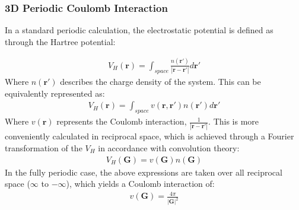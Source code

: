 \documentclass[letterpaper,10pt,english]{sphinxmanual}
\begin{document}
\subsubsection{3D Periodic Coulomb Interaction}
\label{\detokenize{cutoff_coulomb:d-periodic-coulomb-interaction}}
In a standard periodic calculation, the electrostatic potential is
defined as through the Hartree potential:

\label{\detokenize{cutoff_coulomb:equation-hartree}}\begin{equation}\label{equation:cutoff_coulomb:hartree}
\begin{split}V_{H}(\mathbf{r}) = \int_{space} {\frac{n(\mathbf{r'})}{|\mathbf{r} -  \mathbf{r'}|}}  d\mathbf{r'}\end{split}
\end{equation}
Where \(n(\mathbf{r'})\) describes the charge density of the system.
This can be equivalently represented as:
\begin{equation*}
\begin{split}V_{H}(\mathbf{r}) = \int_{space} v(\mathbf{r},\mathbf{r'})n(\mathbf{r'}) d\mathbf{r'}\end{split}
\end{equation*}
Where \(v(\mathbf{r})\) represents the Coulomb interaction,
\(\frac{1}{|\mathbf{r} -  \mathbf{r'}|}\). This is more conveniently
calculated in reciprocal space, which is achieved through a Fourier
transformation of the \(V_{H}\) in accordance with convolution
theory:
\begin{equation*}
\begin{split}V_{H}(\mathbf{G}) = v(\mathbf{G})n(\mathbf{G})\end{split}
\end{equation*}
In the fully periodic case, the above expressions are taken over all
reciprocal space (\(\infty\) to \(-\infty\)), which yields a
Coulomb interaction of:
\begin{equation*}
\begin{split}v(\mathbf{G}) = \frac{4 \pi}{|\mathbf{G}|^2}\end{split}
\end{equation*}
\end{document}
